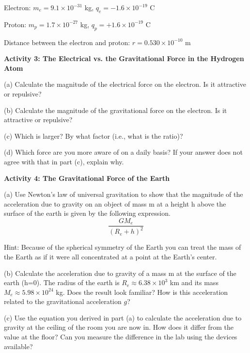 Electron: \(m_{e}  = 9.1 \times 10^{-31} \) kg, \( q_{e}  = - 1.6 
\times 10^{-19} \)
C 

Proton: \( m_{p}  = 1.7 \times 10^{-27} \) kg, \( q_{p}  = +1.6 \times 10^{-19} \)
C 

Distance between the electron and proton: \(r = 0.530 \times 10^{-10} \) m

\textbf{Activity 3: The Electrical vs. the Gravitational Force in the Hydrogen
Atom}

(a) Calculate the magnitude of the electrical force on the electron. Is it attractive
or repulsive?
\vspace{20mm}

(b) Calculate the magnitude of the gravitational force on the electron. Is it
attractive or repulsive?
\vspace{20mm}

(c) Which is larger? By what factor (i.e., what is the ratio)?
\vspace{20mm}

(d) Which force are you more aware of on a daily basis? If your answer does
not agree with that in part (c), explain why.
\vspace{20mm}

\textbf{Activity 4: The Gravitational Force of the Earth}

(a) Use Newton's law of universal gravitation to show that the magnitude of the acceleration due to gravity on an object of mass m at a height h above the surface of the earth is given by the following expression.
\[
\frac{GM_{e}}{\left( R_{e}+h\right) ^{2}}\]


Hint: Because of the spherical symmetry of the Earth you can treat the mass
of the Earth as if it were all concentrated at a point at the Earth's center.
\vspace{40mm}

(b) Calculate the acceleration due to gravity of a mass m at the surface of
the earth (h=0). The radius of the earth is \( R_{e}  \approx   6.38
\times 10^{3} \) km and its mass \( M_{e}  \approx  5.98 \times 10^{24} \)
kg. Does the result look familiar? How is this acceleration related to the gravitational
acceleration $g$?
\vspace{40mm}

(c) Use the equation you derived in part (a) to calculate the acceleration due
to gravity at the ceiling of the room you are now in. How does it differ from
the value at the floor? Can you measure the difference in the lab using the
devices available?
\vspace{30mm}

